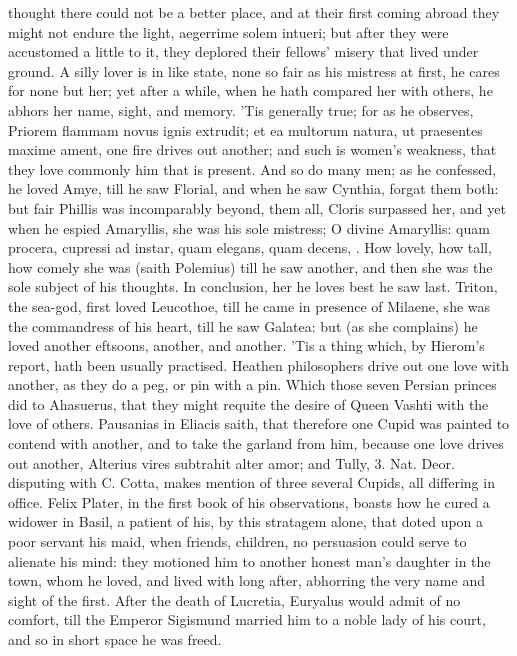 thought there could not be a better place, and at their first coming
abroad they might not endure the light, aegerrime solem intueri; but
after they were accustomed a little to it, they deplored their
fellows' misery that lived under ground. A silly lover is in like
state, none so fair as his mistress at first, he cares for none but
her; yet after a while, when he hath compared her with others, he
abhors her name, sight, and memory. 'Tis generally true; for as he
observes, Priorem flammam novus ignis extrudit; et ea multorum
natura, ut praesentes maxime ament, one fire drives out another; and
such is women's weakness, that they love commonly him that is present.
And so do many men; as he confessed, he loved Amye, till he saw
Florial, and when he saw Cynthia, forgat them both: but fair Phillis
was incomparably beyond, them all, Cloris surpassed her, and yet when
he espied Amaryllis, she was his sole mistress; O divine Amaryllis:
quam procera, cupressi ad instar, quam elegans, quam decens, \etc{}. How
lovely, how tall, how comely she was (saith Polemius) till he saw
another, and then she was the sole subject of his thoughts. In
conclusion, her he loves best he saw last. Triton, the sea-god,
first loved Leucothoe, till he came in presence of Milaene, she was the
commandress of his heart, till he saw Galatea: but (as she
complains) he loved another eftsoons, another, and another. 'Tis a
thing which, by Hierom's report, hath been usually practised.
Heathen philosophers drive out one love with another, as they do
a peg, or pin with a pin. Which those seven Persian princes did to
Ahasuerus, that they might requite the desire of Queen Vashti with the
love of others. Pausanias in Eliacis saith, that therefore one Cupid
was painted to contend with another, and to take the garland from him,
because one love drives out another, Alterius vires subtrahit
alter amor; and Tully, 3. Nat. Deor. disputing with C. Cotta, makes
mention of three several Cupids, all differing in office. Felix Plater,
in the first book of his observations, boasts how he cured a widower in
Basil, a patient of his, by this stratagem alone, that doted upon a
poor servant his maid, when friends, children, no persuasion could
serve to alienate his mind: they motioned him to another honest man's
daughter in the town, whom he loved, and lived with long after,
abhorring the very name and sight of the first. After the death of
Lucretia, Euryalus would admit of no comfort, till the Emperor
Sigismund married him to a noble lady of his court, and so in short
space he was freed.

